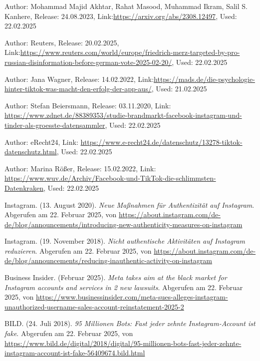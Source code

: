 \documentclass[12pt]{report}
\begin{document}
\begin{thebibliography}{9}
	Author: Mohammad Majid Akhtar, Rahat Masood, Muhammad Ikram, Salil S. Kanhere, Release: 24.08.2023, Link:\url{https://arxiv.org/abs/2308.12497}, Used: 22.02.2025
	
	Author: Reuters, Release: 20.02.2025, Link:\url{https://www.reuters.com/world/europe/friedrich-merz-targeted-by-pro-russian-disinformation-before-german-vote-2025-02-20/}, Used: 22.02.2025
	
	Author: Jana Wagner, Release: 14.02.2022, Link:\url{https://mads.de/die-psychologie-hinter-tiktok-was-macht-den-erfolg-der-app-aus/}, Used: 21.02.2025
	
	Author: Stefan Beiersmann, Release: 03.11.2020, Link: \url{https://www.zdnet.de/88389353/studie-brandmarkt-facebook-instagram-und-tinder-als-groesste-datensammler}, Used: 22.02.2025
	
	Author: eRecht24, Link: \url{https://www.e-recht24.de/datenschutz/13278-tiktok-datenschutz.html}, Used: 22.02.2025
	
	Author: Marina Rößer, Release: 15.02.2022, Link: \url{https://www.wuv.de/Archiv/Facebook-und-TikTok-die-schlimmsten-Datenkraken}, Used: 22.02.2025
	
	 Instagram. (13. August 2020). \textit{Neue Maßnahmen für Authentizität auf Instagram}. Abgerufen am 22. Februar 2025, von \url{https://about.instagram.com/de-de/blog/announcements/introducing-new-authenticity-measures-on-instagram}
	
	 Instagram. (19. November 2018). \textit{Nicht authentische Aktivitäten auf Instagram reduzieren}. Abgerufen am 22. Februar 2025, von \url{https://about.instagram.com/de-de/blog/announcements/reducing-inauthentic-activity-on-instagram}
	
	 Business Insider. (Februar 2025). \textit{Meta takes aim at the black market for Instagram accounts and services in 2 new lawsuits}. Abgerufen am 22. Februar 2025, von \url{https://www.businessinsider.com/meta-sues-alleges-instagram-unauthorized-username-sales-account-reinstatement-2025-2}
	
	 BILD. (24. Juli 2018). \textit{95 Millionen Bots: Fast jeder zehnte Instagram-Account ist fake}. Abgerufen am 22. Februar 2025, von \url{https://www.bild.de/digital/2018/digital/95-millionen-bots-fast-jeder-zehnte-instagram-account-ist-fake-56409674.bild.html}
	

\end{thebibliography}
\end{document}
